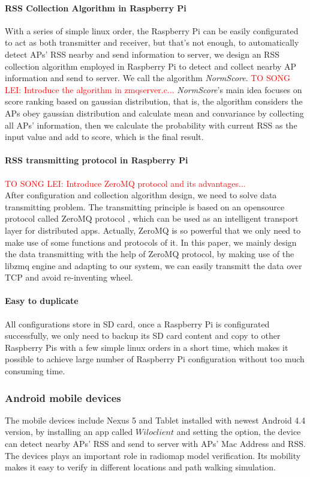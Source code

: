 \documentclass[10pt,conference]{IEEEtran}
\newcommand{\yc}[1]{\textcolor{red}{#1}}
\begin{document}
\paragraph{RSS Collection Algorithm in Raspberry Pi}
With a series of simple linux order, the Raspberry Pi can be easily configurated to act as both transmitter and receiver, but that's not enough, to automatically detect APs' RSS nearby and send information to server, we design an RSS collection algorithm employed in Raspberry Pi to detect and collect nearby AP information and send to server. We call the algorithm \textit{NormScore}. 
\yc{TO SONG LEI: Introduce the algorithm in zmqserver.c...} \textit{NormScore}'s main idea focuses on score ranking based on gaussian distribution, that is, the algorithm considers the APs obey gaussian distribution and calculate mean and convariance by collecting all APs' information, then we calculate the probability with current RSS as the input value and add to score, which is the final result.
\paragraph{RSS transmitting protocol in Raspberry Pi}
\yc{TO SONG LEI: Introduce ZeroMQ protocol and its advantages...} \\
After configuration and collection algorithm design, we need to solve data transmitting problem. The transmitting principle is based on an opensource protocol called ZeroMQ protocol \cite{zmq}, which can be used as an intelligent transport layer for distributed apps. Actually, ZeroMQ is so powerful that we only need to make use of some functions and protocols of it. In this paper, we mainly design the data transmitting with the help of ZeroMQ protocol, by making use of the libzmq engine and adapting to our system, we can easily transmitt the data over TCP and avoid re-inventing wheel.
\paragraph{Easy to duplicate}
All configurations store in SD card, once a Raspberry Pi is configurated successfully, we only need to backup its SD card content and copy to other Raspberry Pis with a few simple linux orders in a short time, which makes it possible to achieve large number of Raspberry Pi configuration without too much consuming time.

\subsubsection{Android mobile devices}
The mobile devices include Nexus 5 and Tablet installed with newest Android 4.4 version, by installing an app called $\textit{Wiloclient}$ and setting the option, the device can detect nearby APs' RSS and send to server with APs' Mac Address and RSS. The devices plays an important role in radiomap model verification. Its mobility makes it easy to verify in different locations and path walking simulation.
\end{document}
